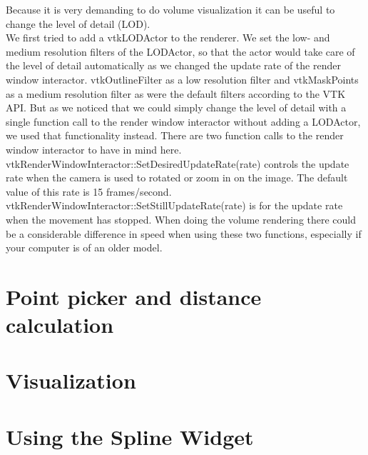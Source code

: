 Because it is very demanding to do volume visualization it can be useful to change the level of detail (LOD). \\
We first tried to add a vtkLODActor to the renderer. We set the low- and medium resolution filters of the LODActor, so that the actor would take care of the level of detail automatically as we changed the update rate of the render window interactor. vtkOutlineFilter as a low resolution filter and vtkMaskPoints as a medium resolution filter as were the default filters according to the VTK API. But as we noticed that we could simply change the level of detail with a single function call to the render window interactor without adding a LODActor, we used that functionality instead. There are two function calls to the render window interactor to have in mind here. vtkRenderWindowInteractor::SetDesiredUpdateRate(rate) controls the
update rate when the camera is used to rotated or zoom in on the image. The default value of this rate is 15 frames/second.
vtkRenderWindowInteractor::SetStillUpdateRate(rate) is for the update rate when the movement has stopped. When doing the volume rendering there could be a considerable difference in speed when using these two functions, especially if your computer is of an older model.

\section{Point picker and distance calculation}


\section{Visualization}


\section{Using the Spline Widget}

